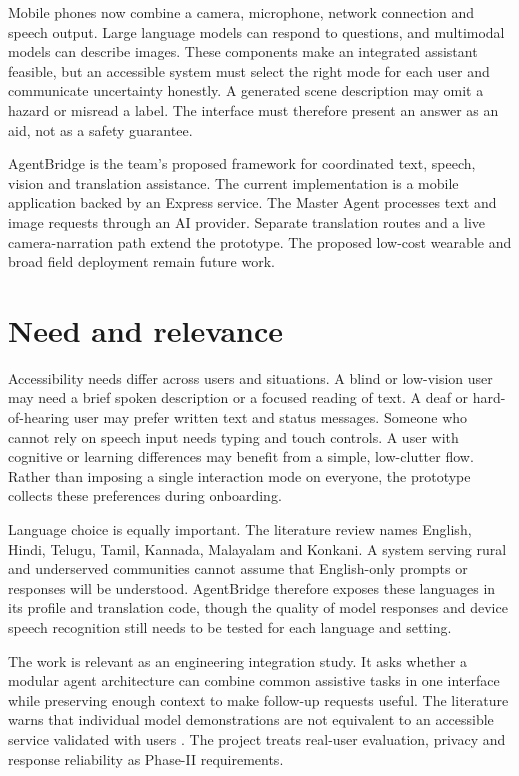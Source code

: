 \documentclass[12pt,a4paper,oneside]{report}
\begin{document}
Mobile phones now combine a camera, microphone, network connection and speech output. Large language models can respond to questions, and multimodal models can describe images. These components make an integrated assistant feasible, but an accessible system must select the right mode for each user and communicate uncertainty honestly. A generated scene description may omit a hazard or misread a label. The interface must therefore present an answer as an aid, not as a safety guarantee.

AgentBridge is the team's proposed framework for coordinated text, speech, vision and translation assistance. The current implementation is a mobile application backed by an Express service. The Master Agent processes text and image requests through an AI provider. Separate translation routes and a live camera-narration path extend the prototype. The proposed low-cost wearable and broad field deployment remain future work.

\section{Need and relevance}
Accessibility needs differ across users and situations. A blind or low-vision user may need a brief spoken description or a focused reading of text. A deaf or hard-of-hearing user may prefer written text and status messages. Someone who cannot rely on speech input needs typing and touch controls. A user with cognitive or learning differences may benefit from a simple, low-clutter flow. Rather than imposing a single interaction mode on everyone, the prototype collects these preferences during onboarding.

Language choice is equally important. The literature review names English, Hindi, Telugu, Tamil, Kannada, Malayalam and Konkani. A system serving rural and underserved communities cannot assume that English-only prompts or responses will be understood. AgentBridge therefore exposes these languages in its profile and translation code, though the quality of model responses and device speech recognition still needs to be tested for each language and setting.

The work is relevant as an engineering integration study. It asks whether a modular agent architecture can combine common assistive tasks in one interface while preserving enough context to make follow-up requests useful. The literature warns that individual model demonstrations are not equivalent to an accessible service validated with users \cite{xu,aljedaani,baghel}. The project treats real-user evaluation, privacy and response reliability as Phase-II requirements.
\end{document}
